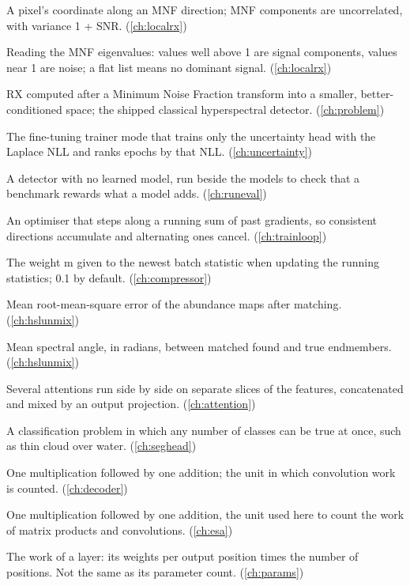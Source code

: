 \begin{description}[style=nextline,leftmargin=1.2em,font=\normalfont\bfseries]
\item[MNF component] A pixel's coordinate along an MNF direction; MNF components are uncorrelated, with variance 1 + SNR. (\cref{ch:localrx})
\item[MNF eigenvalue diagnostic] Reading the MNF eigenvalues: values well above 1 are signal components, values near 1 are noise; a flat list means no dominant signal. (\cref{ch:localrx})
\item[MNF-RX] RX computed after a Minimum Noise Fraction transform into a smaller, better-conditioned space; the shipped classical hyperspectral detector. (\cref{ch:problem})
\item[Mode scale] The fine-tuning trainer mode that trains only the uncertainty head with the Laplace NLL and ranks epochs by that NLL. (\cref{ch:uncertainty})
\item[Model-free baseline] A detector with no learned model, run beside the models to check that a benchmark rewards what a model adds. (\cref{ch:runeval})
\item[Momentum] An optimiser that steps along a running sum of past gradients, so consistent directions accumulate and alternating ones cancel. (\cref{ch:trainloop})
\item[Momentum (BatchNorm)] The weight m given to the newest batch statistic when updating the running statistics; 0.1 by default. (\cref{ch:compressor})
\item[mRMSE] Mean root-mean-square error of the abundance maps after matching. (\cref{ch:hslunmix})
\item[mSAD] Mean spectral angle, in radians, between matched found and true endmembers. (\cref{ch:hslunmix})
\item[Multi-head attention] Several attentions run side by side on separate slices of the features, concatenated and mixed by an output projection. (\cref{ch:attention})
\item[Multi-label] A classification problem in which any number of classes can be true at once, such as thin cloud over water. (\cref{ch:seghead})
\item[Multiply-add] One multiplication followed by one addition; the unit in which convolution work is counted. (\cref{ch:decoder})
\item[Multiply-add (MAC)] One multiplication followed by one addition, the unit used here to count the work of matrix products and convolutions. (\cref{ch:esa})
\item[Multiply-adds] The work of a layer: its weights per output position times the number of positions. Not the same as its parameter count. (\cref{ch:params})

\end{description}
